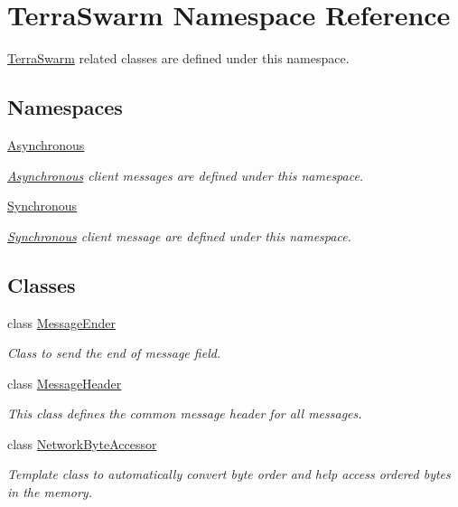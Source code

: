 \hypertarget{namespace_terra_swarm}{\section{Terra\-Swarm Namespace Reference}
\label{namespace_terra_swarm}
}


\hyperlink{namespace_terra_swarm}{Terra\-Swarm} related classes are defined under this namespace.  


\subsection*{Namespaces}
\begin{DoxyCompactItemize}
\item 
\hyperlink{namespace_terra_swarm_1_1_asynchronous}{Asynchronous}
\begin{DoxyCompactList}\small\item\em \hyperlink{namespace_terra_swarm_1_1_asynchronous}{Asynchronous} client messages are defined under this namespace. \end{DoxyCompactList}\item 
\hyperlink{namespace_terra_swarm_1_1_synchronous}{Synchronous}
\begin{DoxyCompactList}\small\item\em \hyperlink{namespace_terra_swarm_1_1_synchronous}{Synchronous} client message are defined under this namespace. \end{DoxyCompactList}\end{DoxyCompactItemize}
\subsection*{Classes}
\begin{DoxyCompactItemize}
\item 
class \hyperlink{class_terra_swarm_1_1_message_ender}{Message\-Ender}
\begin{DoxyCompactList}\small\item\em Class to send the end of message field. \end{DoxyCompactList}\item 
class \hyperlink{class_terra_swarm_1_1_message_header}{Message\-Header}
\begin{DoxyCompactList}\small\item\em This class defines the common message header for all messages. \end{DoxyCompactList}\item 
class \hyperlink{class_terra_swarm_1_1_network_byte_accessor}{Network\-Byte\-Accessor}
\begin{DoxyCompactList}\small\item\em Template class to automatically convert byte order and help access ordered bytes in the memory. \end{DoxyCompactList}\end{DoxyCompactItemize}

